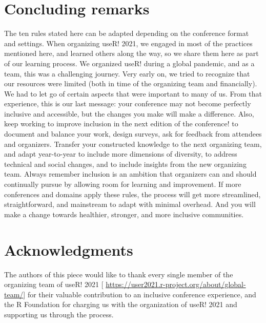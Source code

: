 \documentclass[10pt,letterpaper]{article}
\begin{document}
\section*{Concluding remarks}

The ten rules stated here can be adapted depending on the conference format and settings.
When organizing useR! 2021, we engaged in most of the practices mentioned here, and learned others along the way, so we share them here as part of our learning process. 
We organized useR! during a global pandemic, and as a team, this was a challenging journey. 
Very early on, we tried to recognize that our resources were limited (both in time of the organizing team and financially). 
We had to let go of certain aspects that were important to many of us. 
From that experience, this is our last message: your conference may not become perfectly inclusive and accessible, but the changes you make will make a difference.
Also, keep working to improve inclusion in the next edition of the conference! to document and balance your work, design surveys, ask for feedback from attendees and organizers. Transfer your constructed knowledge to the next organizing team, and adapt year-to-year to include more dimensions of diversity, to address technical and social changes, and to include insights from the new organizing team. Always remember inclusion is an ambition that organizers can and should continually pursue by allowing room for learning and improvement.
If more conferences and domains apply these rules, the process will get more streamlined, straightforward, and mainstream to adapt with minimal overhead.
And you will make a change towards healthier, stronger, and more inclusive communities.




\section*{Acknowledgments}
The authors of this piece would like to thank every single member of the organizing team of useR! 2021 [ \url{https://user2021.r-project.org/about/global-team/}] for their valuable contribution to an inclusive conference experience, and the R Foundation for charging us with the organization of useR! 2021 and supporting us through the process. 




\end{document}
